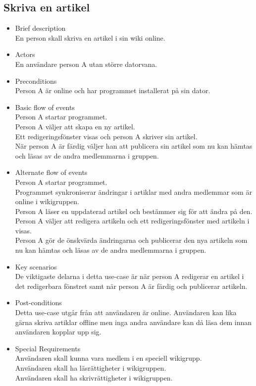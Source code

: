 \subsection{Skriva en artikel}
\begin{itemize}
	\item Brief description
	\\En person skall skriva en artikel i sin wiki online.
	\item Actors
	\\En användare person A utan större datorvana.
	\item Preconditions
	\\Person A är online och har programmet installerat på sin dator.
	\item Basic flow of events
	\\Person A startar programmet.
	\\Person A väljer att skapa en ny artikel.
	\\Ett redigeringsfönster visas och person A skriver sin artikel.
	\\När person A är färdig väljer han att publicera sin artikel som nu kan hämtas och läsas av de andra medlemmarna i gruppen.
	\item Alternate flow of events
	\\Person A startar programmet.
	\\Programmet synkroniserar ändringar i artiklar med andra medlemmar som är online i wikigruppen.
	\\Person A läser en uppdaterad artikel och bestämmer sig för att ändra på den.
	\\Person A väljer att redigera artikeln och ett redigeringsfönster med artikeln i visas.
	\\Person A gör de önskvärda ändringarna	och publicerar den nya artikeln	som nu kan hämtas och läsas av de andra medlemmarna i gruppen.
	\item Key scenarios
	\\De viktigaste delarna i detta use-case är när person A redigerar en artikel i det redigerbara fönstret samt när person A är färdig och publicerar artikeln.
	\item Post-conditions
	\\Detta use-case utgår från att användaren är online. Användaren kan lika gärna skriva artiklar offline men inga  andra användare kan då läsa dem innan användaren kopplar upp sig.
	\item Special Requirements
	\\Användaren skall kunna vara medlem i en speciell wikigrupp.
	\\Användaren skall ha läsrättigheter i wikigruppen.
	\\Användaren skall ha skrivrättigheter i wikigruppen.
\end{itemize}

